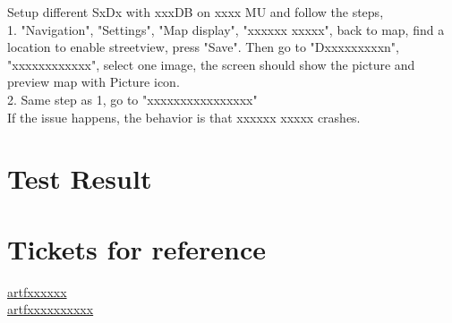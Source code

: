 \documentclass{article}
\begin{document}
Setup different SxDx with xxxDB on xxxx MU and follow the steps,\\

1. "Navigation", "Settings", "Map display", "xxxxxx xxxxx", back to map, find a location to enable streetview, press "Save". Then go to "Dxxxxxxxxxn", "xxxxxxxxxxxx", select one image, the screen should show the picture and preview map with Picture icon.\\

2. Same step as 1, go to "xxxxxxxxxxxxxxxx" \\

If the issue happens, the behavior is that xxxxxx xxxxx crashes.




\section{Test Result}


\begin{center}
\begin{table*}[h]

\caption{Test Result Matrix}
\end{table*}
\end{center}




\section{Tickets for reference}
\href{http://xxxx}{artfxxxxxx }\\
\href{http://xxxxxx}{artfxxxxxxxxxx}
\end{document}

